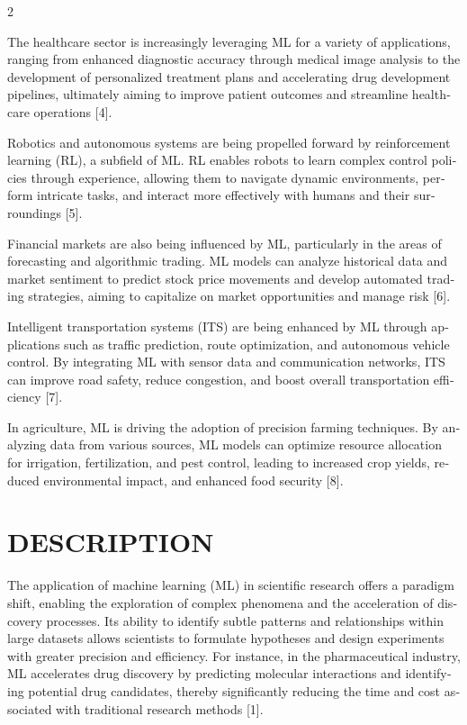 \documentclass[a4paper,10pt,twoside]{article}
\begin{document}
\begin{multicols}{2}
\begin{otherlanguage}{english}
The healthcare sector is increasingly leveraging ML for a variety of applications, ranging from enhanced diagnostic accuracy through medical image analysis to the development of personalized treatment plans and accelerating drug development pipelines, ultimately aiming to improve patient outcomes and streamline healthcare operations [4].

Robotics and autonomous systems are being propelled forward by reinforcement learning (RL), a subfield of ML. RL enables robots to learn complex control policies through experience, allowing them to navigate dynamic environments, perform intricate tasks, and interact more effectively with humans and their surroundings [5].

Financial markets are also being influenced by ML, particularly in the areas of forecasting and algorithmic trading. ML models can analyze historical data and market sentiment to predict stock price movements and develop automated trading strategies, aiming to capitalize on market opportunities and manage risk [6].

Intelligent transportation systems (ITS) are being enhanced by ML through applications such as traffic prediction, route optimization, and autonomous vehicle control. By integrating ML with sensor data and communication networks, ITS can improve road safety, reduce congestion, and boost overall transportation efficiency [7].

In agriculture, ML is driving the adoption of precision farming techniques. By analyzing data from various sources, ML models can optimize resource allocation for irrigation, fertilization, and pest control, leading to increased crop yields, reduced environmental impact, and enhanced food security [8].
    \end{otherlanguage}

    \vspace{0.4em}

    \section*{DESCRIPTION}
    \begin{otherlanguage}{english}
    The application of machine learning (ML) in scientific research offers a paradigm shift, enabling the exploration of complex phenomena and the acceleration of discovery processes. Its ability to identify subtle patterns and relationships within large datasets allows scientists to formulate hypotheses and design experiments with greater precision and efficiency. For instance, in the pharmaceutical industry, ML accelerates drug discovery by predicting molecular interactions and identifying potential drug candidates, thereby significantly reducing the time and cost associated with traditional research methods [1].


\end{otherlanguage}
\end{multicols}
\end{document}
